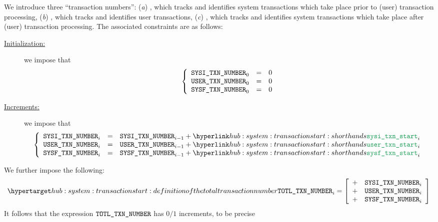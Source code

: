 We introduce three ``transaction numbers'':
(\emph{a}) \sysiTransactionNumber{}, which tracks and identifies system transactions which take place prior to (user) transaction processing,
(\emph{b}) \userTransactionNumber{}, which tracks and identifies user transactions,
(\emph{c}) \sysfTransactionNumber{}, which tracks and identifies system transactions which take place after (user) transaction processing.
The associated constraints are as follows:
\begin{description}
	\item[\underline{Initialization:}] 
		we impose that
		\[
			\left\{ \begin{array}{lcl}
				\texttt{SYSI}\texttt{\_}\texttt{TXN\_NUMBER} _{0} & = & 0 \\
				\texttt{USER}\texttt{\_}\texttt{TXN\_NUMBER} _{0} & = & 0 \\
				\texttt{SYSF}\texttt{\_}\texttt{TXN\_NUMBER} _{0} & = & 0 \\
			\end{array} \right.
		\]
	\item[\underline{Increments:}] 
		we impose that
		\[
			\left\{ \begin{array}{lcl}
				\sysiTransactionNumber _{i} & = & \sysiTransactionNumber _{i - 1} + \sysiTransactionStart _{i} \\
				\userTransactionNumber _{i} & = & \userTransactionNumber _{i - 1} + \userTransactionStart _{i} \\
				\sysfTransactionNumber _{i} & = & \sysfTransactionNumber _{i - 1} + \sysfTransactionStart _{i} \\
			\end{array} \right.
		\]
\end{description}
We further impose the following:
\[
	\hlabel{hub: system: transaction start: definition of the total transaction number}
	\totalTransactionNumber _{i}
	=
	\left[ \begin{array}{cr}
		+ & \sysiTransactionNumber _{i} \\
		+ & \userTransactionNumber _{i} \\
		+ & \sysfTransactionNumber _{i} \\
	\end{array} \right]
\]
\saNote{} \label{hub: system: transaction start: total transaction number increments}
It follows that the expression $\texttt{TOTL}\texttt{\_}\texttt{TXN\_NUMBER}$ has $0/1$ increments, to be precise
